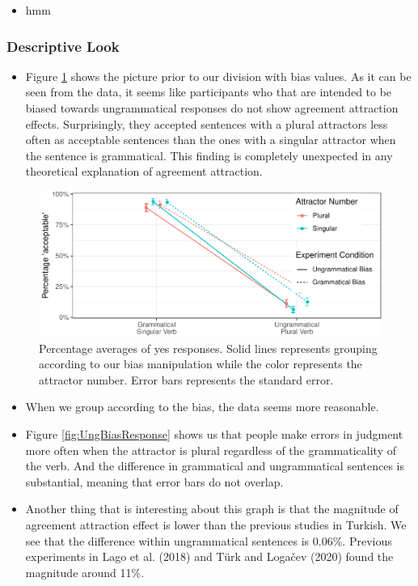 \documentclass[
  10pt,
  english,
  doc,floatsintext]{apa6}
\providecommand{\tightlist}{%
  \setlength{\itemsep}{0pt}\setlength{\parskip}{0pt}}
\begin{document}
\begin{itemize}
\tightlist
\item
  hmm
\end{itemize}

\hypertarget{descriptive-look}{%
\subsubsection{Descriptive Look}\label{descriptive-look}}

\begin{itemize}
\tightlist
\item
  Figure \ref{fig:BeforeBiasDivide} shows the picture prior to our division with bias values. As it can be seen from the data, it seems like participants who that are intended to be biased towards ungrammatical responses do not show agreement attraction effects. Surprisingly, they accepted sentences with a plural attractors less often as acceptable sentences than the ones with a singular attractor when the sentence is grammatical. This finding is completely unexpected in any theoretical explanation of agreement attraction.
\end{itemize}

\begin{figure}
\centering
\includegraphics{paperdraft_files/figure-latex/BeforeBiasDivide-1.pdf}
\caption{\label{fig:BeforeBiasDivide}Percentage averages of yes responses. Solid lines represents grouping according to our bias manipulation while the color represents the attractor number. Error bars represents the standard error.}
\end{figure}

\begin{itemize}
\tightlist
\item
  When we group according to the bias, the data seems more reasonable.
\item
  Figure \ref{fig:UngBiasResponse} shows us that people make errors in judgment more often when the attractor is plural regardless of the grammaticality of the verb. And the difference in grammatical and ungrammatical sentences is substantial, meaning that error bars do not overlap.
\item
  Another thing that is interesting about this graph is that the magnitude of agreement attraction effect is lower than the previous studies in Turkish. We see that the difference within ungrammatical sentences is 0.06\%. Previous experiments in Lago et al. (2018) and Türk and Logačev (2020) found the magnitude around 11\%.
\end{itemize}
\end{document}

